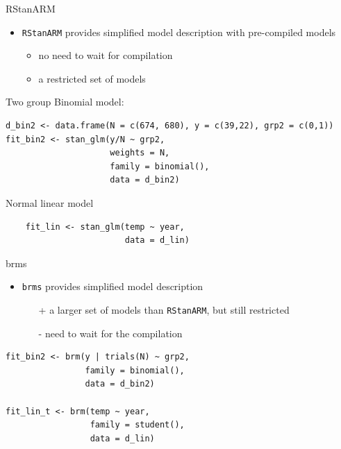 \documentclass[finnish,english,t]{beamer}
\begin{document}
\begin{frame}[fragile]{RStanARM}

  \begin{itemize}
  \item \texttt{RStanARM} provides simplified model description with
    pre-compiled models
    \begin{itemize}
    \item no need to wait for compilation
    \item a restricted set of models
    \end{itemize}
  \end{itemize}

Two group Binomial model:
  {\footnotesize
\begin{verbatim}
d_bin2 <- data.frame(N = c(674, 680), y = c(39,22), grp2 = c(0,1))
fit_bin2 <- stan_glm(y/N ~ grp2,
                     weights = N,
                     family = binomial(),
                     data = d_bin2)
\end{verbatim}
  }
    Normal linear model
  {\footnotesize
\begin{verbatim}
    fit_lin <- stan_glm(temp ~ year,
                        data = d_lin)
\end{verbatim}
  }

    
\end{frame} 


\begin{frame}[fragile]{brms}

  \begin{itemize}
  \item \texttt{brms} provides simplified model description
    \begin{itemize}
    \item[+] a larger set of models than \texttt{RStanARM}, but still restricted
    \item[-] need to wait for the compilation
    \end{itemize}
  \end{itemize}

  {\footnotesize
\begin{verbatim}
fit_bin2 <- brm(y | trials(N) ~ grp2,
                family = binomial(),
                data = d_bin2)

fit_lin_t <- brm(temp ~ year,
                 family = student(),
                 data = d_lin)
\end{verbatim}
  }
    
\end{frame} 
\end{document}

